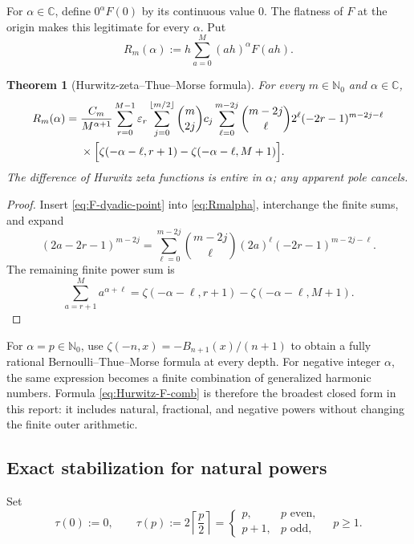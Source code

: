 \documentclass[11pt]{article}
\newtheorem{theorem}{Theorem}[section]
\theoremstyle{definition}
\newcommand{\eps}{\varepsilon}
\newcommand{\N}{\mathbb{N}}
\newcommand{\C}{\mathbb{C}}
\begin{document}
For $\alpha\in\C$, define $0^\alpha F(0)$ by its continuous value $0$.  The
flatness of $F$ at the origin makes this legitimate for every $\alpha$.
Put
\begin{equation}
 R_m(\alpha):=h\sum_{a=0}^{M}(ah)^\alpha F(ah).
 \label{eq:Rmalpha}
\end{equation}

\begin{theorem}[Hurwitz-zeta--Thue--Morse formula]
\label{thm:Hurwitz-F-comb}
For every $m\in\N_0$ and $\alpha\in\C$,
\begin{equation}
\begin{split}
 R_m(\alpha)
 ={}&\frac{C_m}{M^{\alpha+1}}
 \sum_{r=0}^{M-1}\eps_r
 \sum_{j=0}^{\lfloor m/2\rfloor}\binom m{2j}c_j
 \sum_{\ell=0}^{m-2j}\binom{m-2j}{\ell}2^\ell
 (-2r-1)^{m-2j-\ell}\\
 &\times\Bigl[
 \zeta(-\alpha-\ell,r+1)
 -\zeta(-\alpha-\ell,M+1)
 \Bigr].
\end{split}
\label{eq:Hurwitz-F-comb}
\end{equation}
The difference of Hurwitz zeta functions is entire in $\alpha$; any apparent
pole cancels.
\end{theorem}

\begin{proof}
Insert \eqref{eq:F-dyadic-point} into \eqref{eq:Rmalpha}, interchange the
finite sums, and expand
\[
 (2a-2r-1)^{m-2j}
 =\sum_{\ell=0}^{m-2j}\binom{m-2j}{\ell}
 (2a)^\ell(-2r-1)^{m-2j-\ell}.
\]
The remaining finite power sum is
\[
 \sum_{a=r+1}^{M}a^{\alpha+\ell}
 =\zeta(-\alpha-\ell,r+1)-\zeta(-\alpha-\ell,M+1).
\]
\end{proof}

For $\alpha=p\in\N_0$, use
$\zeta(-n,x)=-B_{n+1}(x)/(n+1)$ to obtain a fully rational
Bernoulli--Thue--Morse formula at every depth.  For negative integer
$\alpha$, the same expression becomes a finite combination of generalized
harmonic numbers.  Formula \eqref{eq:Hurwitz-F-comb} is therefore the broadest
closed form in this report: it includes natural, fractional, and negative
powers without changing the finite outer arithmetic.

\subsection{Exact stabilization for natural powers}

Set
\begin{equation}
 \tau(0):=0,
 \qquad
 \tau(p):=2\left\lceil\frac p2\right\rceil
 =\begin{cases}p,&p\text{ even},\\p+1,&p\text{ odd},\end{cases}
 \quad p\ge1.
 \label{eq:tau}
\end{equation}
\end{document}

